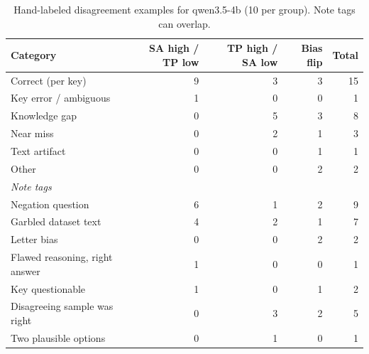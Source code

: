 \begin{table}[t]
\centering
\small
\caption{Hand-labeled disagreement examples for qwen3.5-4b (10 per group). Note tags can overlap.}
\label{tab:error-analysis}
\begin{tabular}{lrrrr}
\toprule
Category & SA high / TP low & TP high / SA low & Bias flip & Total \\
\midrule
Correct (per key) & 9 & 3 & 3 & 15 \\
Key error / ambiguous & 1 & 0 & 0 & 1 \\
Knowledge gap & 0 & 5 & 3 & 8 \\
Near miss & 0 & 2 & 1 & 3 \\
Text artifact & 0 & 0 & 1 & 1 \\
Other & 0 & 0 & 2 & 2 \\
\midrule
\multicolumn{5}{l}{\emph{Note tags}} \\
Negation question & 6 & 1 & 2 & 9 \\
Garbled dataset text & 4 & 2 & 1 & 7 \\
Letter bias & 0 & 0 & 2 & 2 \\
Flawed reasoning, right answer & 1 & 0 & 0 & 1 \\
Key questionable & 1 & 0 & 1 & 2 \\
Disagreeing sample was right & 0 & 3 & 2 & 5 \\
Two plausible options & 0 & 1 & 0 & 1 \\
\bottomrule
\end{tabular}
\end{table}
